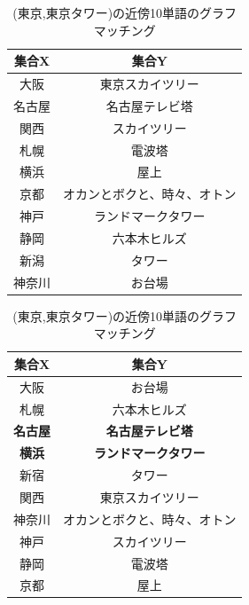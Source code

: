 \begin{table}[h]
  \begin{minipage}[t]{.45\textwidth}
    \caption[(東京,東京タワー)の近傍10単語]{(東京,東京タワー)の近傍10単語}
    \label{}
    \begin{center}
      \begin{tabular}{|c||c|} \hline
        集合X & 集合Y \\ \hline \hline
        大阪 & 東京スカイツリー \\
        名古屋 & 名古屋テレビ塔 \\
        関西 & スカイツリー \\
        札幌 & 電波塔 \\
        横浜 & 屋上 \\
        京都 & オカンとボクと、時々、オトン \\
        神戸 & ランドマークタワー \\
        静岡 & 六本木ヒルズ \\
        新潟 & タワー \\
        神奈川 & お台場 \\ \hline
      \end{tabular}
    \end{center}
  \end{minipage}
  \hfill
  \begin{minipage}[t]{.45\textwidth}
    \caption[(東京,東京タワー)の近傍10単語のグラフマッチング]{(東京,東京タワー)の近傍10単語のグラフマッチング}
    \label{}
    \begin{center}
      \begin{tabular}{|c||c|} \hline
        集合X & 集合Y \\ \hline \hline
        大阪 & お台場 \\
        札幌 & 六本木ヒルズ \\
        \textbf{名古屋} & \textbf{名古屋テレビ塔} \\
        \textbf{横浜} & \textbf{ランドマークタワー} \\
        新宿 & タワー \\
        関西 & 東京スカイツリー \\
        神奈川 & オカンとボクと、時々、オトン \\
        神戸 & スカイツリー \\
        静岡 & 電波塔 \\
        京都 & 屋上 \\ \hline
      \end{tabular}
    \end{center}
  \end{minipage}
\end{table}

